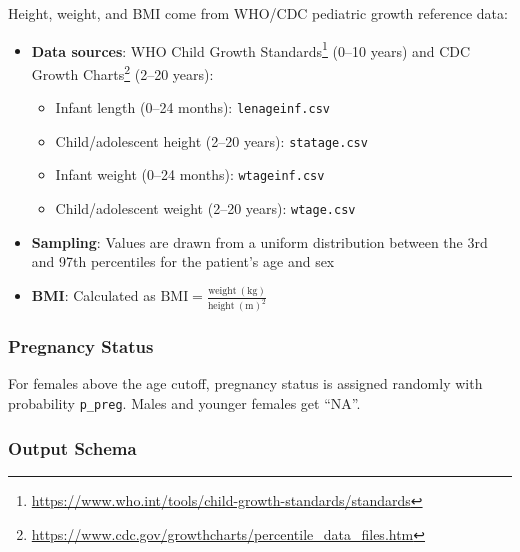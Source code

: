 Height, weight, and BMI come from WHO/CDC pediatric growth reference data:
\begin{itemize}
    \item \textbf{Data sources}: WHO Child Growth Standards\footnote{\url{https://www.who.int/tools/child-growth-standards/standards}} (0--10 years) and CDC Growth Charts\footnote{\url{https://www.cdc.gov/growthcharts/percentile_data_files.htm}} (2--20 years):
    \begin{itemize}
        \item Infant length (0--24 months): \texttt{lenageinf.csv}
        \item Child/adolescent height (2--20 years): \texttt{statage.csv}
        \item Infant weight (0--24 months): \texttt{wtageinf.csv}
        \item Child/adolescent weight (2--20 years): \texttt{wtage.csv}
    \end{itemize}
    \item \textbf{Sampling}: Values are drawn from a uniform distribution between the 3rd and 97th percentiles for the patient's age and sex
    \item \textbf{BMI}: Calculated as $\mathrm{BMI} = \frac{\mathrm{weight~(kg)}}{\mathrm{height~(m)}^2}$
\end{itemize}

\subsubsection{Pregnancy Status}

For females above the age cutoff, pregnancy status is assigned randomly with probability \texttt{p\_preg}. Males and younger females get ``NA''.

\subsubsection{Output Schema}

